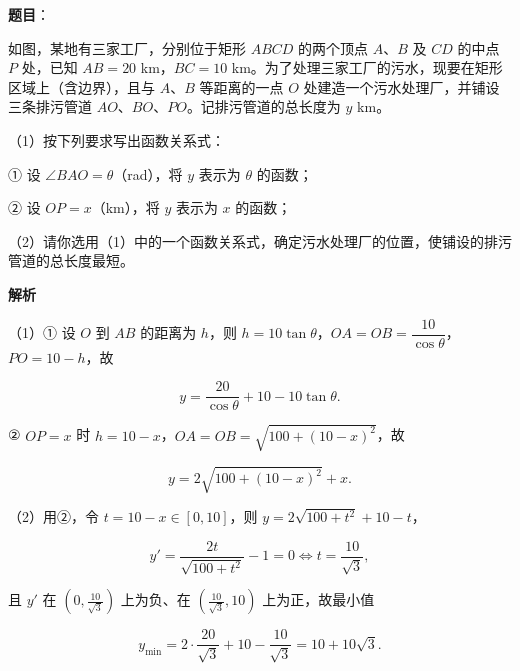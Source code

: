 \begin{answer}

\textbf{题目}：

如图，某地有三家工厂，分别位于矩形 $ABCD$ 的两个顶点 $A$、$B$ 及 $CD$ 的中点 $P$ 处，已知 $AB=20$ km，$BC=10$ km。为了处理三家工厂的污水，现要在矩形区域上（含边界），且与 $A$、$B$ 等距离的一点 $O$ 处建造一个污水处理厂，并铺设三条排污管道 $AO$、$BO$、$PO$。记排污管道的总长度为 $y$ km。

（1）按下列要求写出函数关系式：

① 设 $\angle BAO=\theta$（rad），将 $y$ 表示为 $\theta$ 的函数；

② 设 $OP=x$（km），将 $y$ 表示为 $x$ 的函数；

（2）请你选用（1）中的一个函数关系式，确定污水处理厂的位置，使铺设的排污管道的总长度最短。
\nopagebreak[4]
\begin{center}\end{center}
\nopagebreak[4]
\textbf{解析}

（1）① 设 $O$ 到 $AB$ 的距离为 $h$，则 $h=10\tan\theta$，$OA=OB=\dfrac{10}{\cos\theta}$，$PO=10-h$，故

\nopagebreak[4]
\[y=\frac{20}{\cos\theta}+10-10\tan\theta.\]

② $OP=x$ 时 $h=10-x$，$OA=OB=\sqrt{100+(10-x)^2}$，故

\nopagebreak[4]
\[y=2\sqrt{100+(10-x)^2}+x.\]

（2）用②，令 $t=10-x\in[0,10]$，则 $y=2\sqrt{100+t^2}+10-t$，

\nopagebreak[4]
\[y'=\frac{2t}{\sqrt{100+t^2}}-1=0\iff t=\frac{10}{\sqrt3},\]

且 $y'$ 在 $\left(0,\frac{10}{\sqrt3}\right)$ 上为负、在 $\left(\frac{10}{\sqrt3},10\right)$ 上为正，故最小值

\nopagebreak[4]
\[y_{\min}=2\cdot\frac{20}{\sqrt3}+10-\frac{10}{\sqrt3}=10+10\sqrt3.\]


\end{answer}
